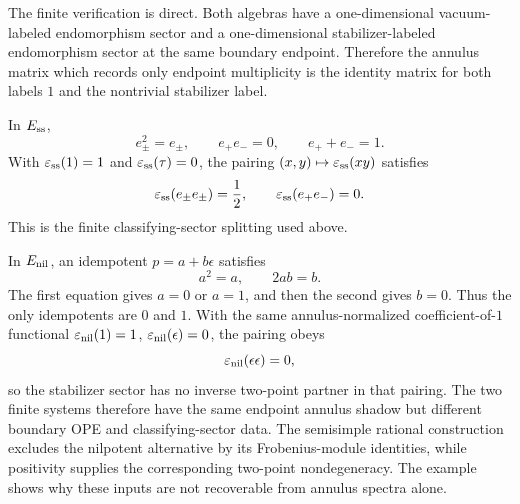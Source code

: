 The finite verification is direct.  Both algebras have a one-dimensional
vacuum-labeled endomorphism sector and a one-dimensional stabilizer-labeled
endomorphism sector at the same boundary
endpoint.  Therefore the annulus matrix which records only endpoint
multiplicity is the identity matrix for both labels \(1\) and the nontrivial
stabilizer label.

In \(E_{\rm ss}\),
\[
  e_\pm^2=e_\pm,\qquad e_+e_-=0,\qquad e_++e_-=1.
\]
With \(\varepsilon_{\rm ss}(1)=1\) and \(\varepsilon_{\rm ss}(\tau)=0\), the
pairing \((x,y)\mapsto\varepsilon_{\rm ss}(xy)\) satisfies
\[
  \varepsilon_{\rm ss}(e_\pm e_\pm)=\frac12,\qquad
  \varepsilon_{\rm ss}(e_+e_-)=0.
\]
This is the finite classifying-sector splitting used above.

In \(E_{\rm nil}\), an idempotent \(p=a+b\epsilon\) satisfies
\[
  a^2=a,\qquad 2ab=b.
\]
The first equation gives \(a=0\) or \(a=1\), and then the second gives
\(b=0\).  Thus the only idempotents are \(0\) and \(1\).  With the same
annulus-normalized coefficient-of-\(1\) functional
\(\varepsilon_{\rm nil}(1)=1\), \(\varepsilon_{\rm nil}(\epsilon)=0\), the
pairing obeys
\[
  \varepsilon_{\rm nil}(\epsilon\epsilon)=0,
\]
so the stabilizer sector has no inverse two-point partner in that pairing.
The two finite systems therefore have the same endpoint annulus shadow but
different boundary OPE and classifying-sector data.  The semisimple rational
construction excludes the nilpotent alternative by its Frobenius-module
identities, while positivity supplies the corresponding two-point
nondegeneracy.  The example shows why these inputs are not recoverable from
annulus spectra alone.

